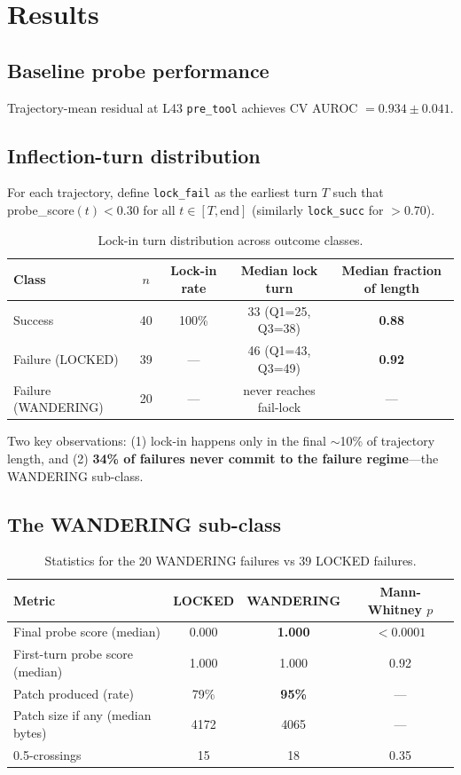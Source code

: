 \documentclass[11pt]{article}
\begin{document}
\section{Results}\label{sec:results}

\subsection{Baseline probe performance}
Trajectory-mean residual at L43 \texttt{pre\_tool} achieves CV AUROC $= \mathbf{0.934 \pm 0.041}$.

\subsection{Inflection-turn distribution}
For each trajectory, define \texttt{lock\_fail} as the earliest turn $T$ such that probe\_score$(t) < 0.30$ for all $t \in [T, \text{end}]$ (similarly \texttt{lock\_succ} for $>0.70$).

\begin{table}[h]
\centering
\caption{Lock-in turn distribution across outcome classes.}
\begin{tabular}{lcccc}
\toprule
Class & $n$ & Lock-in rate & Median lock turn & Median fraction of length \\
\midrule
Success & 40 & 100\% & 33 (Q1=25, Q3=38) & \textbf{0.88} \\
Failure (LOCKED) & 39 & --- & 46 (Q1=43, Q3=49) & \textbf{0.92} \\
Failure (WANDERING) & 20 & --- & never reaches fail-lock & --- \\
\bottomrule
\end{tabular}
\end{table}

Two key observations: (1) lock-in happens only in the final $\sim$10\% of trajectory length, and (2) \textbf{34\% of failures never commit to the failure regime}---the WANDERING sub-class.

\subsection{The WANDERING sub-class}
\begin{table}[h]
\centering
\caption{Statistics for the 20 WANDERING failures vs 39 LOCKED failures.}
\begin{tabular}{lccc}
\toprule
Metric & LOCKED & WANDERING & Mann-Whitney $p$ \\
\midrule
Final probe score (median) & 0.000 & \textbf{1.000} & $<0.0001$ \\
First-turn probe score (median) & 1.000 & 1.000 & 0.92 \\
Patch produced (rate) & 79\% & \textbf{95\%} & --- \\
Patch size if any (median bytes) & 4172 & 4065 & --- \\
0.5-crossings & 15 & 18 & 0.35 \\
\bottomrule
\end{tabular}
\end{table}
\end{document}
